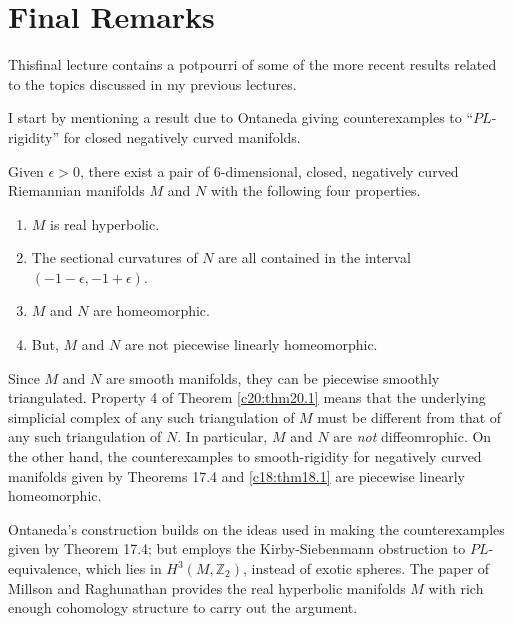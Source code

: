 \chapter{Final Remarks}\label{c20}

This\pageoriginale final lecture contains a potpourri of some of the
more recent results related to the topics discussed in my previous
lectures.

I start by mentioning a result due to Ontaneda \cite{83} giving
counterexamples to ``$PL$-rigidity'' for closed negatively curved
manifolds.

\begin{thm}[Ontaneda]\label{c20:thm20.1}
Given $\epsilon>0$, there exist a pair of $6$-dimen\-sional, closed,
negatively curved Riemannian manifolds $M$ and $N$ with the following
four properties.
\begin{enumerate}
\item $M$ is real hyperbolic.

\item The sectional curvatures of $N$ are all contained in the
  interval $(-1-\epsilon,-1+\epsilon)$.

\item $M$ and $N$ are homeomorphic.

\item But, $M$ and $N$ are not piecewise linearly homeomorphic.
\end{enumerate}
\end{thm}

\begin{remark*}
Since $M$ and $N$ are smooth manifolds, they can be piecewise smoothly
triangulated. Property 4 of Theorem \ref{c20:thm20.1} means that the
underlying simplicial complex of any such triangulation of $M$ must be
different from that of any such triangulation of $N$. In particular,
$M$ and $N$ are {\em not} diffeomrophic. On the other hand, the
counterexamples to smooth-rigidity for negatively curved manifolds
given by Theorems 17.4 and \ref{c18:thm18.1} are
piecewise linearly homeomorphic.
\end{remark*}

Ontaneda's construction builds on the ideas used in making the\break
counterexamples given by Theorem 17.4; but employs the
Kirby-Sie\-benmann obstruction to $PL$-equivalence, which lies in
$H^{3}(M,\mathbb{Z}_{2})$, instead of exotic spheres. The paper of
Millson and Raghunathan \cite{71} provides the real hyperbolic
manifolds $M$ with rich enough cohomology structure to carry out the
argument.


